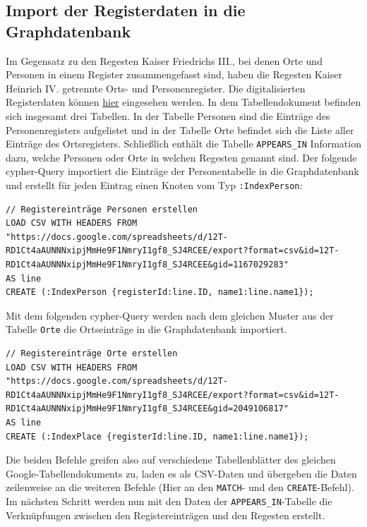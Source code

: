 \documentclass[ngerman,]{scrreprt}
\begin{document}
\subsection{Import der Registerdaten in die Graphdatenbank}\label{import-der-registerdaten-in-die-graphdatenbank-1}

Im Gegensatz zu den Regesten Kaiser Friedrichs III., bei denen Orte und Personen in einem Register zusammengefasst sind, haben die Regesten Kaiser Heinrich IV. getrennte Orts- und Personenregister. Die digitalisierten Registerdaten können \href{https://docs.google.com/spreadsheets/d/12T-RD1Ct4aAUNNNxipjMmHe9F1NmryI1gf8_SJ4RCEE/edit?usp=sharing}{hier} eingesehen werden. In dem Tabellendokument befinden sich insgesamt drei Tabellen. In der Tabelle Personen sind die Einträge des Personenregisters aufgelistet und in der Tabelle Orte befindet sich die Liste aller Einträge des Ortsregisters. Schließlich enthält die Tabelle \texttt{APPEARS\_IN} Information dazu, welche Personen oder Orte in welchen Regesten genannt sind. Der folgende cypher-Query importiert die Einträge der Personentabelle in die Graphdatenbank und erstellt für jeden Eintrag einen Knoten vom Typ \texttt{:IndexPerson}:

\begin{verbatim}
// Registereinträge Personen erstellen
LOAD CSV WITH HEADERS FROM "https://docs.google.com/spreadsheets/d/12T-RD1Ct4aAUNNNxipjMmHe9F1NmryI1gf8_SJ4RCEE/export?format=csv&id=12T-RD1Ct4aAUNNNxipjMmHe9F1NmryI1gf8_SJ4RCEE&gid=1167029283"
AS line
CREATE (:IndexPerson {registerId:line.ID, name1:line.name1});
\end{verbatim}

Mit dem folgenden cypher-Query werden nach dem gleichen Muster aus der Tabelle \texttt{Orte} die Ortseinträge in die Graphdatenbank importiert.

\begin{verbatim}
// Registereinträge Orte erstellen
LOAD CSV WITH HEADERS FROM "https://docs.google.com/spreadsheets/d/12T-RD1Ct4aAUNNNxipjMmHe9F1NmryI1gf8_SJ4RCEE/export?format=csv&id=12T-RD1Ct4aAUNNNxipjMmHe9F1NmryI1gf8_SJ4RCEE&gid=2049106817"
AS line
CREATE (:IndexPlace {registerId:line.ID, name1:line.name1});
\end{verbatim}

Die beiden Befehle greifen also auf verschiedene Tabellenblätter des gleichen Google-Tabellendokuments zu, laden es als CSV-Daten und übergeben die Daten zeilenweise an die weiteren Befehle (Hier an den \texttt{MATCH}- und den \texttt{CREATE}-Befehl). Im nächsten Schritt werden nun mit den Daten der \texttt{APPEARS\_IN}-Tabelle die Verknüpfungen zwischen den Registereinträgen und den Regesten erstellt.
\end{document}
